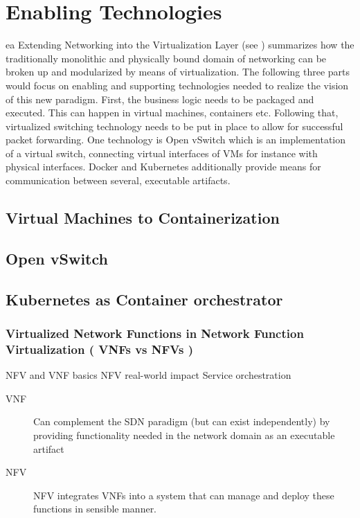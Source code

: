 



\section{Enabling Technologies}ea
Extending Networking into the Virtualization Layer (see \cite{pfaff2009extending}) summarizes how the traditionally monolithic and physically bound domain of networking can be broken up and modularized by means of virtualization. The following three parts would focus on enabling and supporting technologies needed to realize the vision of this new paradigm. First, the business logic needs to be packaged and executed. This can happen in virtual machines, containers etc. Following that, virtualized switching technology needs to be put in place to allow for successful packet forwarding. One technology is Open vSwitch which is an implementation of a virtual switch, connecting virtual interfaces of VMs for instance with physical interfaces. Docker and Kubernetes additionally provide means for communication between several, executable artifacts.
\subsection{Virtual Machines to Containerization}
\subsection{Open vSwitch}
\subsection{Kubernetes as Container orchestrator}

\quad


\subsubsection{Virtualized Network Functions in Network Function Virtualization ( VNFs vs NFVs )}
NFV and VNF basics \cite{mijumbi2016network} NFV real-world impact \cite{bilal2016impact} Service orchestration \cite{de2019network}

\begin{description}
	\item [VNF] Can complement the SDN paradigm (but can exist independently)  by providing functionality needed in the network domain as an executable artifact
	\item [NFV] NFV integrates VNFs into a system that can manage and deploy these functions in sensible manner. 
\end{description}
